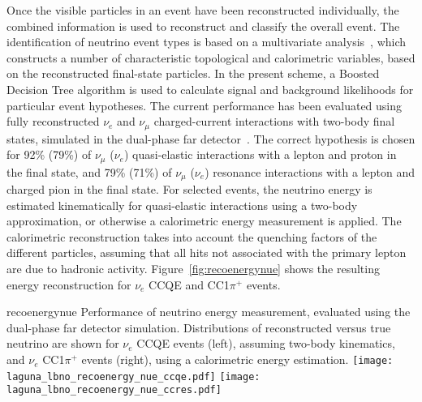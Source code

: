 Once the visible particles in an event have been reconstructed individually, 
the combined information is used to reconstruct and classify the overall event.
The identification of neutrino event types is based on a 
multivariate analysis~\cite{Back:2013cva,WA105_TDR,LAGUNA-LBNO-deliv,LAGUNA-LBNO-EOI},
which constructs a number of characteristic topological and calorimetric variables,
based on the reconstructed final-state particles. In the present scheme,
a Boosted Decision Tree algorithm is used to calculate signal and background likelihoods 
for particular event hypotheses. The current performance has been evaluated using fully reconstructed
$\nu_{e}$ and $\nu_{\mu}$ charged-current interactions with two-body final states,
simulated in the dual-phase far detector~\cite{LAGUNA-LBNO-deliv}. 
The correct hypothesis is chosen for 92\% (79\%) of $\nu_{\mu}$ ($\nu_{e}$) quasi-elastic interactions 
with a lepton and proton in the final state, and 79\% (71\%) of $\nu_{\mu}$ ($\nu_{e}$) 
resonance interactions with a lepton and charged pion in the final state.
For selected events, the neutrino energy is estimated kinematically for quasi-elastic interactions
using a two-body approximation, or otherwise a calorimetric energy measurement is applied.
The calorimetric reconstruction takes into account the quenching factors of the different particles, 
assuming that all hits not associated with the primary lepton are due to hadronic activity.
Figure~\ref{fig:recoenergynue} shows the resulting energy reconstruction for $\nu_e$ CCQE and CC1$\pi^{+}$ events.

\begin{cdrfigure}{recoenergynue}
{Performance of neutrino energy measurement, evaluated using the dual-phase far detector simulation. 
Distributions of reconstructed versus true neutrino are shown for $\nu_{e}$ CCQE events (left),
assuming two-body kinematics, and $\nu_{e}$  CC1$\pi^{+}$ events (right),
using a calorimetric energy estimation.}
\texttt{[image: laguna\_lbno\_recoenergy\_nue\_ccqe.pdf]}
\texttt{[image: laguna\_lbno\_recoenergy\_nue\_ccres.pdf]}
\end{cdrfigure}


